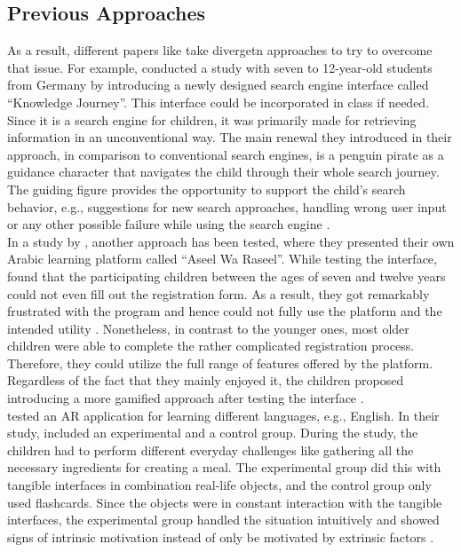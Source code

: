 \subsection{Previous Approaches}
\label{subsection:PreviousApproaches}
As a result, different papers like \textcite[]{gossen2012search, alhussayen2015evaluating, lozano2016dedigitalizing} take divergetn approaches to try to overcome that issue. 
For example, \textcite{gossen2012search} conducted a study with seven to 12-year-old students from Germany by introducing a newly designed search engine interface called ``Knowledge Journey''. This interface could be incorporated in class if needed. Since it is a search engine for children, it was primarily made for retrieving information in an unconventional way. The main renewal they introduced in their approach, in comparison to conventional search engines, is a penguin pirate as a guidance character that navigates the child through their whole search journey. The guiding figure provides the opportunity to support the child's search behavior, e.g., suggestions for new search approaches, handling wrong user input or any other possible failure while using the search engine \autocite{gossen2012search}.\\
In a study by \textcite{alhussayen2015evaluating}, another approach has been tested, where they presented their own Arabic learning platform called ``Aseel Wa Raseel''. While testing the interface, \textcite{alhussayen2015evaluating} found that the participating children between the ages of seven and twelve years could not even fill out the registration form. As a result, they got remarkably frustrated with the program and hence could not fully use the platform and the intended utility \autocite{alhussayen2015evaluating}. 
Nonetheless, in contrast to the younger ones, most older children were able to complete the rather complicated registration process. Therefore, they could utilize the full range of features offered by the platform. Regardless of the fact that they mainly enjoyed it, the children proposed introducing a more gamified approach after testing the interface \autocite{alhussayen2015evaluating}.\\
\textcite{lozano2016dedigitalizing} tested an AR application for learning different languages, e.g., English. In their study, \textcite{lozano2016dedigitalizing} included an experimental and a control group. During the study, the children had to perform different everyday challenges like gathering all the necessary ingredients for creating a meal. The experimental group did this with tangible interfaces in combination real-life objects, and the control group only used flashcards. 
Since the objects were in constant interaction with the tangible interfaces, the experimental group handled the situation intuitively and showed signs of intrinsic motivation instead of only be motivated by extrinsic factors \autocite{lozano2016dedigitalizing}.

